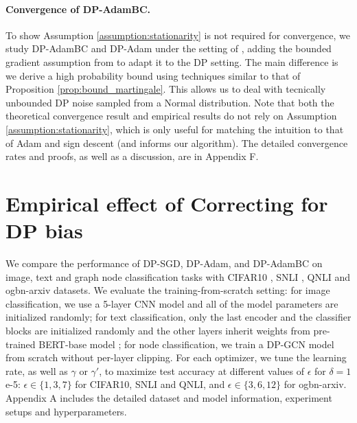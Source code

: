\documentclass[letterpaper]{article} %
\begin{document}
\paragraph{Convergence of DP-AdamBC.}
To show Assumption \ref{assumption:stationarity} is not required for convergence, we study DP-AdamBC and DP-Adam under the setting of \citet{défossez2022simple}, adding the bounded gradient assumption from \citet{li2023dp2} to adapt it to the DP setting.
The main difference is we derive a high probability bound using techniques similar to that of Proposition \ref{prop:bound_martingale}. This allows us to deal with tecnically unbounded DP noise sampled from a Normal distribution. Note that both the theoretical convergence result and empirical results do not rely on Assumption \ref{assumption:stationarity}, which is only useful for matching the intuition to that of Adam and sign descent (and informs our algorithm). The detailed convergence rates and proofs, as well as a discussion, are in Appendix F.

\section{Empirical effect of Correcting for DP bias}
\label{sec:exp}

We compare the performance of DP-SGD, DP-Adam, and DP-AdamBC on image, text and graph node classification tasks with CIFAR10 \citep{cifar10_data}, SNLI \citep{bowman-etal-2015-large}, QNLI \citep{wang2019glue} and ogbn-arxiv \citep{hu2021open} datasets. We evaluate the training-from-scratch setting: for image classification, we use a 5-layer CNN model and all of the model parameters are initialized randomly; for text classification, only the last encoder and the classifier blocks are initialized randomly and the other layers inherit weights from pre-trained BERT-base model \citep{bert_paper}; for node classification, we train a DP-GCN model \citep{daigavane2022nodelevel} from scratch without per-layer clipping. For each optimizer, we tune the learning rate, as well as $\gamma$ or $\gamma'$, to maximize test accuracy at different values of $\epsilon$ for $\delta=1$e-5: $\epsilon \in \{1, 3, 7\}$ for CIFAR10, SNLI and QNLI, and $\epsilon \in \{3, 6, 12\}$ for ogbn-arxiv.
Appendix A includes the detailed dataset and model information, experiment setups and hyperparameters.
\end{document}
